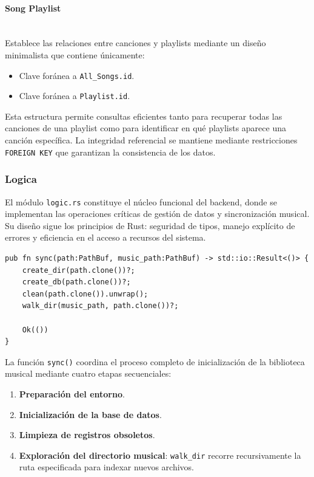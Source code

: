 \documentclass[11pt, a4paper]{article}
\begin{document}
              \paragraph{Song Playlist}
              ‎ \\

              Establece las relaciones entre canciones y playlists mediante un diseño minimalista que contiene únicamente:

              \begin{itemize}
                \item Clave foránea a \verb|All_Songs.id|.
                \item Clave foránea a \verb|Playlist.id|.
              \end{itemize}

              Esta estructura permite consultas eficientes tanto para recuperar todas las canciones de una playlist como para identificar en qué playlists aparece una canción específica. La integridad referencial se mantiene mediante restricciones \verb|FOREIGN KEY| que garantizan la consistencia de los datos.

            \subsubsection{Logica}

            El módulo \verb|logic.rs| constituye el núcleo funcional del backend, donde se implementan las operaciones críticas de gestión de datos y sincronización musical. Su diseño sigue los principios de Rust: seguridad de tipos, manejo explícito de errores y eficiencia en el acceso a recursos del sistema.

            \begin{lstlisting}[caption={fn sync()}]
pub fn sync(path:PathBuf, music_path:PathBuf) -> std::io::Result<()> {
    create_dir(path.clone())?;
    create_db(path.clone())?;
    clean(path.clone()).unwrap();
    walk_dir(music_path, path.clone())?;

    Ok(())
}
            \end{lstlisting}

            La función \verb|sync()| coordina el proceso completo de inicialización de la biblioteca musical mediante cuatro etapas secuenciales:

            \begin{enumerate}
                \item \textbf{Preparación del entorno}.
                \item \textbf{Inicialización de la base de datos}.
                \item \textbf{Limpieza de registros obsoletos}.
                \item \textbf{Exploración del directorio musical}: \verb|walk_dir| recorre recursivamente la ruta especificada para indexar nuevos archivos.
            \end{enumerate}
\end{document}

